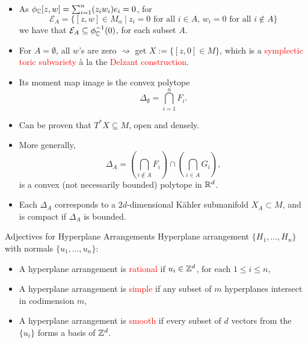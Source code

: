 \begin{frame}
    \begin{itemize} 
    \item As $\phi_{\mathbb{C}}[z,w] = \sum_{i=1}^{n}(z_{i}w_{i})e_{i} = 0$, for
    \[
        \mathcal{E}_{A} = \{[z,w] \in M_{\alpha}\ |\ z_{i} = 0 \text{ for all } i \in A,\, w_{i} = 0 \text{ for all } i \not\in A \} 
    \]
    we have that $\mathcal{E}_{A} \subseteq \phi_{\mathbb{C}}^{-1}(0)$, for each subset $A$.
    \item For $A = \emptyset$, all $w$'s are zero $\rightsquigarrow$ get $X := \{[z,0] \in M\}$, which is a \textcolor{red}{symplectic toric subvariety} \`a la the \textcolor{red}{Delzant construction}.
    \item Its moment map image is the convex polytope
    \[
        \Delta_{\emptyset} = \bigcap_{i=1}^{n} F_{i}.    
    \]
    \item Can be proven that $T^{\ast}X \subseteq M$, open and densely.
    \end{itemize}
\end{frame}

\begin{frame}
    \begin{itemize}
        \item More generally,
        \[
            \Delta_{A} = \left(\bigcap_{i \not\in A} F_{i}\right) \cap \left( \bigcap_{i \in A} G_{i} \right),
        \]
        is a convex (not necessarily bounded) polytope in $\mathbb{R}^{d}$.
        \item Each $\Delta_{A}$ corresponds to a $2d$-dimensional K\"ahler submanifold $X_{A} \subset M$, and is compact if $\Delta_{A}$ is bounded.
    \end{itemize}
\end{frame}

\begin{frame}{Adjectives for Hyperplane Arrangements}
    Hyperplane arrangement $\{H_{1}, \ldots, H_{n}\}$ with normals $\{u_{1}, \ldots, u_{n}\}$:
    \begin{itemize}
        \item A hyperplane arrangement is \textcolor{red}{rational} if $u_{i} \in \mathbb{Z}^{d}$, for each $1 \leq i \leq n$,
        \item A hyperplane arrangement is \textcolor{red}{simple} if any subset of $m$ hyperplanes intersect in codimension $m$,
        \item A hyperplane arrangement is \textcolor{red}{smooth} if every subset of $d$ vectors from the $\{u_{i}\}$ forms a basis of $\mathbb{Z}^{d}$.
    \end{itemize}
\end{frame}

